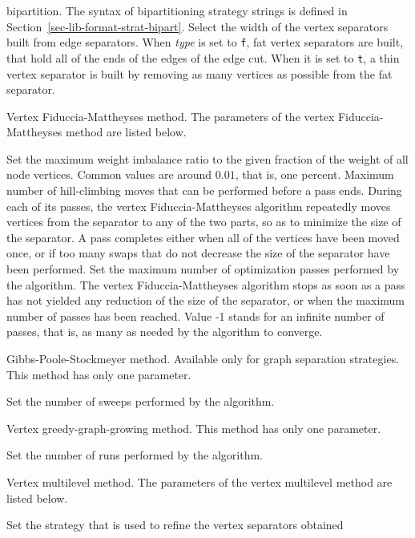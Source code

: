 \begin{itemize}
\begin{itemize}
bipartition. The syntax of bipartitioning
strategy strings is defined in Section~\ref{sec-lib-format-strat-bipart}.
\iteme[{\tt width=}{\it type}]
Select the width of the vertex separators built from edge separators.
When {\it type\/} is set to {\tt f}, fat vertex separators are built,
that hold all of the ends of the edges of the edge cut. When it is set
to {\tt t}, a thin vertex separator is built by removing as many
vertices as possible from the fat separator.
\end{itemize}
\iteme[{\tt f}]
Vertex Fiduccia-Mattheyses method. The parameters of the vertex
Fiduccia-Mattheyses method are listed below.
\begin{itemize}
\iteme[{\tt bal=}{\it rat}]
Set the maximum weight imbalance ratio to the given fraction of
the weight of all node vertices. Common values are around $0.01$,
that is, one percent.
\iteme[{\tt move=}{\it nbr}]
Maximum number of hill-climbing moves that can be performed before a
pass ends. During each of its passes, the vertex Fiduccia-Mattheyses
algorithm repeatedly moves vertices from the separator to any of the
two parts, so as to minimize the size of the separator. A pass
completes either when all of the vertices have been moved once, or if
too many swaps that do not decrease the size of the separator have
been performed.
\iteme[{\tt pass=}{\it nbr}]
Set the maximum number of optimization passes performed by the
algorithm. The vertex Fiduccia-Mattheyses algorithm stops as soon as a
pass has not yielded any reduction of the size of the separator, or
when the maximum number of passes has been reached. Value -1 stands
for an infinite number of passes, that is, as many as needed by the
algorithm to converge.
\end{itemize}
\iteme[{\tt g}]
Gibbs-Poole-Stockmeyer method. Available only for graph separation strategies.
This method has only one parameter.
\begin{itemize}
\iteme[{\tt pass=}{\it nbr}]
Set the number of sweeps performed by the algorithm.
\end{itemize}
\iteme[{\tt h}]
Vertex greedy-graph-growing method. This method has only one parameter.
\begin{itemize}
\iteme[{\tt pass=}{\it nbr}]
Set the number of runs performed by the algorithm.
\end{itemize}
\iteme[{\tt m}]
Vertex multilevel method. The parameters of the vertex
multilevel method are listed below.
\begin{itemize}
\iteme[{\tt asc=}{\it strat}]
Set the strategy that is used to refine the vertex separators obtained

\end{itemize}
\end{itemize}
